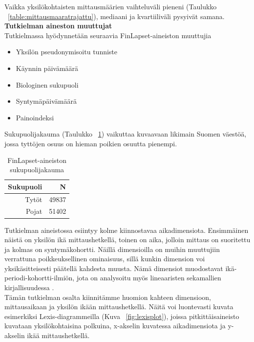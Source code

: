 \documentclass[finnish]{docopts}
\begin{document}
Vaikka yksilökohtaisten mittausmäärien vaihteluväli pieneni (Taulukko ~\ref{table:mittausmaaratrajattu}), mediaani ja kvartiiliväli pysyivät samana. \\

\textbf{Tutkielman aineston muuttujat}\\

Tutkielmassa hyödynnetään seuraavia FinLapset-aineiston muuttujia

\begin{itemize}
    \item Yksilön pseudonymisoitu tunniste
    \item Käynnin päivämäärä
    \item Biologinen sukupuoli
    \item Syntymäpäivämäärä
    \item Painoindeksi
\end{itemize}

Sukupuolijakauma (Taulukko ~\ref{table:sukupuolijakauma}) vaikuttaa kuvaavaan likimain Suomen väestöä, jossa tyttöjen osuus on hieman poikien osuutta pienempi.\\

\begin{table}[H]
\centering
\begin{tabular}{rr}
\toprule
Sukupuoli & N\\
\midrule
Tytöt & 49837\\
Pojat & 51402\\
\bottomrule
\end{tabular}
\caption{FinLapset-aineiston sukupuolijakauma}
\label{table:sukupuolijakauma}
\end{table}

Tutkielman aineistossa esiintyy kolme kiinnostavaa aikadimensiota. Ensimmäinen näistä on yksilön ikä mittaushetkellä, toinen on aika, jolloin mittaus on suoritettu ja kolmas on syntymäkohortti. Näillä dimensioilla on muihin muuttujiin verrattuna poikkeuksellinen ominaisuus, sillä kunkin dimension voi yksikäsitteisesti päätellä kahdesta muusta. Nämä dimensiot muodostavat ikä-periodi-kohortti-ilmiön, jota on analysoitu myös lineaaristen sekamallien kirjallisuudessa \cite{yang06}.\\

Tämän tutkielman osalta kiinnitämme huomion kahteen dimensioon, mittausaikaan ja yksilön ikään mittaushetkellä. Näitä voi luontevasti kuvata esimerkiksi Lexis-diagrammeilla (Kuva ~\ref{fig:lexisplot}), joissa pitkittäisaineisto kuvataan yksilökohtaisina polkuina, x-akselin kuvatessa aikadimensiota ja y-akselin ikää mittaushetkellä.\\
\end{document}
